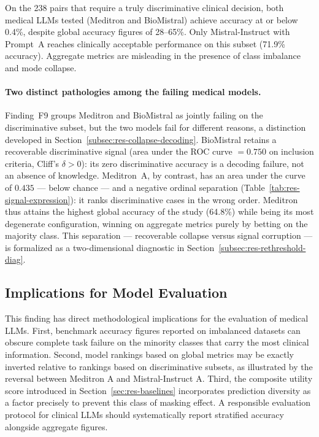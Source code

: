 \begin{finding}
    On the 238 pairs that require a truly discriminative clinical 
    decision, both medical LLMs tested (Meditron and BioMistral) achieve 
    accuracy at or below 0.4\%, despite global accuracy figures of 
    28--65\%. Only Mistral-Instruct with Prompt~A reaches clinically 
    acceptable performance on this subset (71.9\% accuracy). Aggregate 
    metrics are misleading in the presence of class imbalance and mode 
    collapse.
\end{finding}

\paragraph{Two distinct pathologies among the failing medical models.} 
Finding~F9 groups Meditron and BioMistral as jointly failing on the 
discriminative subset, but the two models fail for different reasons, a 
distinction developed in Section~\ref{subsec:res-collapse-decoding}. 
BioMistral retains a recoverable discriminative signal (area under the 
ROC curve $= 0.750$ on inclusion criteria, Cliff's $\delta > 0$): its 
zero discriminative accuracy is a decoding failure, not an absence of 
knowledge. Meditron~A, by contrast, has an area under the curve of 
$0.435$ --- below chance --- and a negative ordinal separation 
(Table~\ref{tab:res-signal-expression}): it ranks discriminative cases in 
the wrong order. Meditron thus attains the highest global accuracy of the 
study (64.8\%) while being its most degenerate configuration, winning on 
aggregate metrics purely by betting on the majority class. This 
separation --- recoverable collapse versus signal corruption --- is 
formalized as a two-dimensional diagnostic in 
Section~\ref{subsec:res-rethreshold-diag}.

\subsection{Implications for Model Evaluation}
\label{subsec:res-non-trivial-implications}

This finding has direct methodological implications for the evaluation 
of medical LLMs. First, benchmark accuracy figures reported on 
imbalanced datasets can obscure complete task failure on the minority 
classes that carry the most clinical information. Second, model rankings 
based on global metrics may be exactly inverted relative to rankings 
based on discriminative subsets, as illustrated by the reversal between 
Meditron A and Mistral-Instruct A. Third, the composite utility score 
introduced in Section~\ref{sec:res-baselines} incorporates prediction 
diversity as a factor precisely to prevent this class of masking effect. 
A responsible evaluation protocol for clinical LLMs should systematically 
report stratified accuracy alongside aggregate figures.
